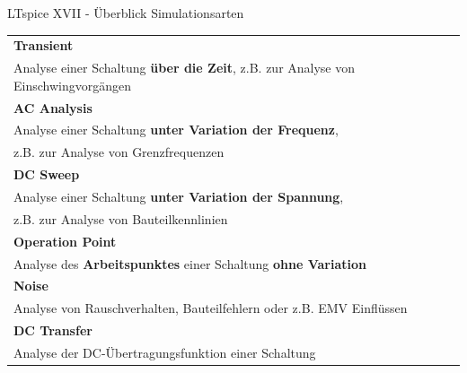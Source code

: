 \documentclass{beamer}
\begin{document}
\begin{frame}{LTspice XVII - Überblick Simulationsarten}

  \begin{scriptsize}
    \begin{tabular}{ l }
      \hline
      \textbf{Transient}                                                                       \\
      Analyse einer Schaltung \textbf{über die Zeit}, z.B. zur Analyse von Einschwingvorgängen \\
      \hline
      \textbf{AC Analysis}                                                                     \\
      Analyse einer Schaltung \textbf{unter Variation der Frequenz},                           \\ z.B. zur Analyse von Grenzfrequenzen\\
      \hline
      \textbf{DC Sweep}                                                                        \\
      Analyse einer Schaltung \textbf{unter Variation der Spannung},                           \\ z.B. zur Analyse von Bauteilkennlinien\\
      \hline
      \textbf{Operation Point}                                                                 \\
      Analyse des \textbf{Arbeitspunktes} einer Schaltung \textbf{ohne Variation}              \\
      \hline
      \textbf{Noise}                                                                           \\
      Analyse von Rauschverhalten, Bauteilfehlern oder z.B. EMV Einflüssen                     \\
      \hline
      \textbf{DC Transfer}                                                                     \\
      Analyse der DC-Übertragungsfunktion einer Schaltung                                      \\
      \hline
    \end{tabular}
  \end{scriptsize}

\end{frame}
\end{document}
